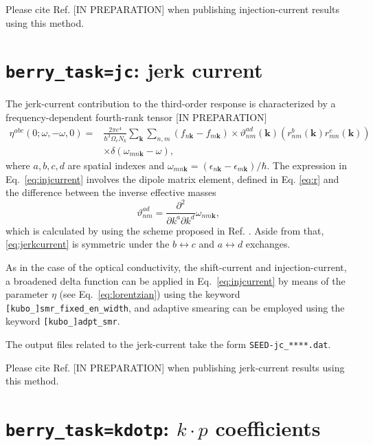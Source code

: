 Please cite Ref. [IN PREPARATION] when publishing injection-current results using this method.

\section{{\tt berry\_task=jc}: jerk current}

The jerk-current contribution to the third-order response
is characterized by a frequency-dependent fourth-rank tensor [IN PREPARATION]
\begin{equation}\label{eq:jerkcurrent}
\begin{split}
\eta^{abc}(0;\omega,-\omega, 0)=&\frac{2\pi e^4}{\hbar^3 \Omega_c N_k}
\sum_{\bm{k}} \sum_{n,m}(f_{n\bm{k}}-f_{m\bm{k}})
\times
\vartheta^{ad}_{nm}(\bm{k})\left(r^b_{ nm}(\bm{k})r^c_{mn}(\bm{k})\right)\\
&\times \delta(\omega_{mn\bm{k}}-\omega),
\end{split}
\end{equation}
where $a,b,c, d$ are spatial indexes
and $\omega_{mn\bm{k}}=(\epsilon_{n\bm{k}}-\epsilon_{m\bm{k}})/\hbar$.
The expression in Eq.~\ref{eq:injcurrent} involves 
the dipole matrix element, defined in Eq. \eqref{eq:r}
and the difference between the inverse effective masses
\begin{equation}
	\label{eq:eff_mass}
	\vartheta^{ad}_{nm} = \frac{\partial^2}{\partial k^a \partial k^d} \omega_{nm\bm{k}},
\end{equation}
which is calculated by using the scheme proposed in Ref. \cite{yates-prb07}.
Aside from that, \eqref{eq:jerkcurrent} is symmetric under the $b\leftrightarrow c$ and $a\leftrightarrow d$ exchanges.

As in the case of the optical conductivity, the shift-current and injection-current, a broadened delta function can be 
applied in Eq.~\ref{eq:injcurrent} by means of the parameter
$\eta$ (see Eq.~\ref{eq:lorentzian}) using the keyword 
{\tt[kubo\_]smr\_fixed\_en\_width}, and adaptive smearing can 
be employed using the keyword {\tt [kubo\_]adpt\_smr}. 

The output files related to the jerk-current take the form \verb|SEED-jc_****.dat|. 

Please cite Ref. [IN PREPARATION] when publishing jerk-current results using this method.


\section{{\tt berry\_task=kdotp}: $k\cdot p$ coefficients}
\label{sec:kdotp}

